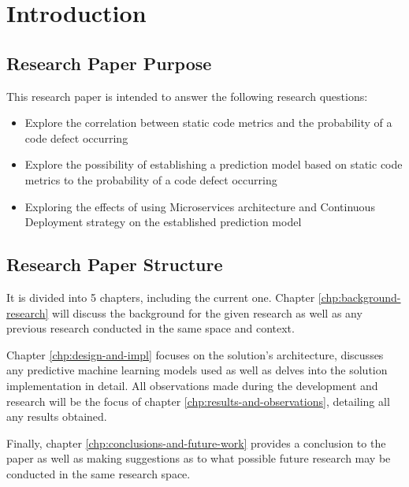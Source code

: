 \chapter{Introduction}\label{chp:intro}
\section{Research Paper Purpose}
This research paper is intended to answer the following research questions:
\begin{itemize}
\item Explore the correlation between static code metrics and the probability of a code defect occurring
\item Explore the possibility of establishing a prediction model based on static code metrics to the probability of a code defect occurring 
\item Exploring the effects of using Microservices architecture and Continuous Deployment strategy on the established prediction model
\end{itemize}
\section{Research Paper Structure}
It is divided into 5 chapters, including the current one. Chapter \ref{chp:background-research} will discuss the background for the given research as well as any previous research conducted in the same space and context. 

Chapter \ref{chp:design-and-impl} focuses on the solution's architecture, discusses any predictive machine learning models used as well as delves into the solution implementation in detail. All observations made during the development and research will be the focus of chapter \ref{chp:results-and-observations}, detailing all any results obtained.

Finally, chapter \ref{chp:conclusions-and-future-work} provides a conclusion to the paper as well as making suggestions as to what possible future research may be conducted in the same research space.

